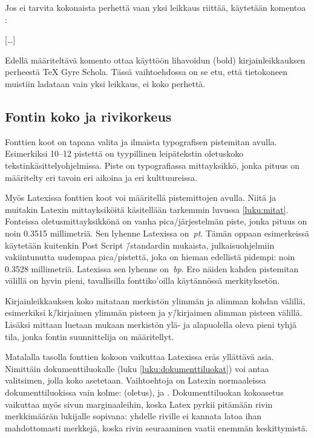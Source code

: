 \pagebreak[3]

Jos ei tarvita kokonaista perhettä vaan yksi leikkaus riittää, käytetään
komentoa :

\begin{koodilohkosis}
  […]
\end{koodilohkosis}

Edellä määriteltävä komento  ottaa käyttöön
lihavoidun (bold) kirjainleikkauksen perheestä TeX Gyre Scho\-la. Tässä
vaih\-to\-eh\-dos\-sa on se etu, että tietokoneen muistiin ladataan vain
yksi leikkaus, ei koko perhettä.

\subsection{Fontin koko ja rivikorkeus}

Fonttien koot on tapana valita ja ilmaista typografisen pistemitan
avulla. Esimerkiksi 10--12 pistettä on tyypillinen leipätekstin
oletuskoko teks\-tin\-kä\-sit\-tely\-ohjel\-mis\-sa. Piste on
typografiassa mitta\-yksikkö, jonka pituus on määritelty eri tavoin eri
aikoina ja eri kulttuureissa.

Myös Latexissa fonttien koot voi määritellä pistemittojen avulla. Niitä
ja muitakin Latexin mit\-ta\-yk\-si\-köi\-tä käsitellään tarkemmin
luvussa \ref{luku:mitat}. Fonteissa ole\-tus\-mitta\-yk\-sik\-kö\-nä on
vanha pica\-/järjestelmän piste, jonka pituus on noin \num{0,3515}
millimetriä. Sen lyhenne Latexissa on~\emph{pt}. Tämän oppaan
esimerkeissä käytetään kuitenkin Post Script \=/standardin mukaista,
julkaisuohjelmiin vakiintunutta uudempaa pica\-/pistettä, joka on hieman
edellistä pidempi: noin \num{0,3528} millimetriä. Latexissa sen lyhenne
on~\emph{bp}. Ero näiden kahden pistemitan välillä on hyvin pieni,
tavallisilla fonttiko'oilla käytännössä merkityksetön.

Kirjainleikkauksen koko mitataan merkistön ylimmän ja alimman kohdan
välillä, esimerkiksi k\=/kirjaimen ylimmän pisteen ja y\=/kirjaimen
alimman pisteen välillä. Lisäksi mittaan luetaan mukaan merkistön ylä-
ja alapuolella oleva pieni tyhjä tila, jonka fontin suunnittelija on
määritellyt.

Matalalla tasolla fonttien kokoon vaikuttaa Latexissa eräs yllättävä
asia. Nimittäin dokumenttiluokalle (luku \ref{luku:dokumenttiluokat})
voi antaa valitsimen, jolla koko asetetaan. Vaihtoehtoja on Latexin
normaaleissa dokumenttiluokissa vain kolme: \koodi{10pt} (oletus),
\koodi{11pt} ja \koodi{12pt}. Dokumenttiluokan koko\-asetus vaikuttaa
myös sivun marginaaleihin, koska Latex pyrkii pitämään rivin
merkkimäärän lukijalle sopivana: yhdelle riville ei kannata latoa ihan
mahdottomasti merkkejä, koska rivin seuraaminen vaatii enemmän
keskittymistä.

